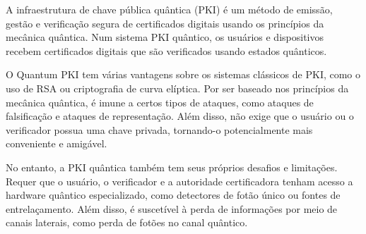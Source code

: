 A infraestrutura de chave pública quântica (PKI) é um método de emissão, gestão e verificação segura de certificados digitais usando os princípios da mecânica quântica. Num sistema PKI quântico, os usuários e dispositivos recebem certificados digitais que são verificados usando estados quânticos.

O Quantum PKI tem várias vantagens sobre os sistemas clássicos de PKI, como o uso de RSA ou criptografia de curva elíptica. Por ser baseado nos princípios da mecânica quântica, é imune a certos tipos de ataques, como ataques de falsificação e ataques de representação. Além disso, não exige que o usuário ou o verificador possua uma chave privada, tornando-o potencialmente mais conveniente e amigável.

No entanto, a PKI quântica também tem seus próprios desafios e limitações. Requer que o usuário, o verificador e a autoridade certificadora tenham acesso a hardware quântico especializado, como detectores de fotão único ou fontes de entrelaçamento. Além disso, é suscetível à perda de informações por meio de canais laterais, como perda de fotões no canal quântico.

\newpage
